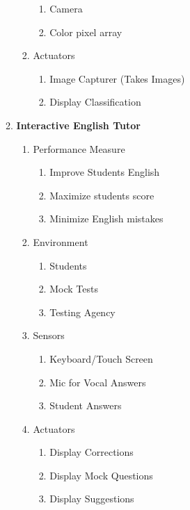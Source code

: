 \documentclass[12pt,letterpaper]{article}
\begin{document}
\begin{enumerate}
\begin{enumerate}
\begin{enumerate}
\begin{enumerate}
                \item Camera
                \item Color pixel array
                \end{enumerate}
            \item Actuators
                \begin{enumerate}
                \item Image Capturer (Takes Images)
                \item Display Classification
                \end{enumerate}
            \end{enumerate}
        \item \textbf{Interactive English Tutor}
            \begin{enumerate}
            \item Performance Measure
                \begin{enumerate}
                \item Improve Students English
                \item Maximize students score
                \item Minimize English mistakes
                \end{enumerate}
            \item Environment
                \begin{enumerate}
                \item Students
                \item Mock Tests
                \item Testing Agency
                \end{enumerate}
            \item Sensors
                \begin{enumerate}
                \item Keyboard/Touch Screen
                \item Mic for Vocal Answers
                \item Student Answers
                \end{enumerate}
            \item Actuators
                \begin{enumerate}
                \item Display Corrections
                \item Display Mock Questions
                \item Display Suggestions
                \end{enumerate}
            \end{enumerate}
    \end{enumerate}
\end{enumerate}
\end{document}
